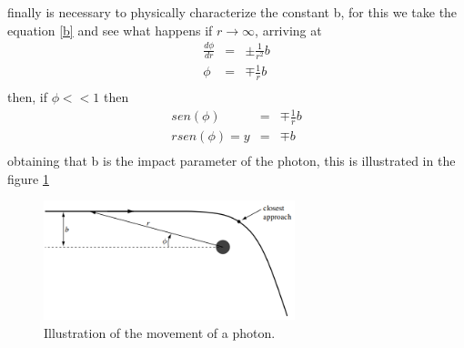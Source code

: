 \documentclass[letterpaper,11pt,onecolumn]{article}
\begin{document}
finally is necessary to physically characterize the constant b, for this we take the equation \ref{b} and see what happens if $r\rightarrow \infty$, arriving at
\begin{eqnarray*}
    \frac{d\phi}{dr}&=&\pm \frac{1}{r^{2}}b\\
    \phi&=&\mp \frac{1}{r}b\\
\end{eqnarray*}
then, if $\phi << 1$ then
\begin{eqnarray*}
       sen(\phi)&=&\mp \frac{1}{r}b \\
       rsen(\phi)=y&=&\mp b\\
\end{eqnarray*}
obtaining that b is the impact parameter of the photon, this is illustrated in the figure \ref{bp}
 \begin{figure}[h!]
    \centering
    \includegraphics[width=0.65\textwidth]{Report/Images/3_foton_esc_b.png}
    \caption{Illustration of the movement of a photon.}
\label{bp}
\end{figure}
\end{document}
